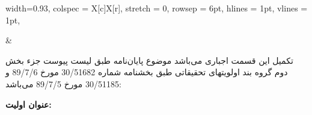 
	\begin{table}[H]
		\label{Segment: 7}
		\begin{tblr}{
				width=0.93\textwidth,
				colspec = {X[c]X[r]},
				stretch = 0,
				rowsep = 6pt,
				hlines = {1pt},
				vlines = {1pt},
			}
			
			\HODSign
			
			&
			
			\justifying
			تکمیل این قسمت اجباری می‌باشد موضوع پایان‌نامه طبق لیست پیوست جزء بخش دوم گروه 
			\fillblanka
			بند 
			\fillblankb
			اولویتهای تحقیقاتی طبق بخشنامه شماره 
			30/51682
			مورخ
			89/7/6
			و
			30/51185
			مورخ
			89/7/5
			می‌باشد:
			
			\vspace{2mm}\noindent
			\textbf{عنوان اولیت:} 
			\Ptitle
			\\	
		\end{tblr}
	\end{table}


